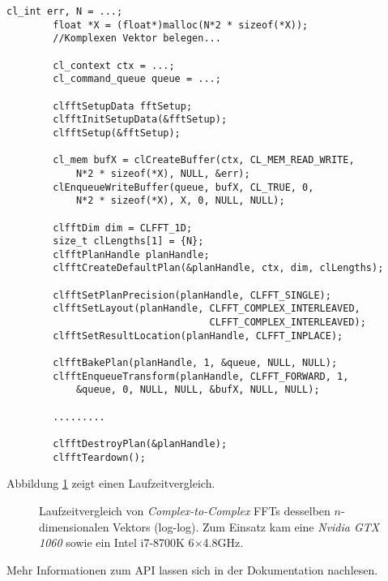 		\begin{lstlisting}[caption=clFFT Beispiel]
		cl_int err, N = ...;
		float *X = (float*)malloc(N*2 * sizeof(*X));
		//Komplexen Vektor belegen...
		
		cl_context ctx = ...;
		cl_command_queue queue = ...;
		
		clfftSetupData fftSetup;
		clfftInitSetupData(&fftSetup);
		clfftSetup(&fftSetup);

		cl_mem bufX = clCreateBuffer(ctx, CL_MEM_READ_WRITE, 
			N*2 * sizeof(*X), NULL, &err);
		clEnqueueWriteBuffer(queue, bufX, CL_TRUE, 0, 
			N*2 * sizeof(*X), X, 0, NULL, NULL);
		
		clfftDim dim = CLFFT_1D;
		size_t clLengths[1] = {N};
		clfftPlanHandle planHandle;
		clfftCreateDefaultPlan(&planHandle, ctx, dim, clLengths);

		clfftSetPlanPrecision(planHandle, CLFFT_SINGLE);
		clfftSetLayout(planHandle, CLFFT_COMPLEX_INTERLEAVED, 
			                       CLFFT_COMPLEX_INTERLEAVED);
		clfftSetResultLocation(planHandle, CLFFT_INPLACE);

		clfftBakePlan(planHandle, 1, &queue, NULL, NULL);
		clfftEnqueueTransform(planHandle, CLFFT_FORWARD, 1, 
			&queue, 0, NULL, NULL, &bufX, NULL, NULL);
		
		.........
		
		clfftDestroyPlan(&planHandle);
		clfftTeardown();
		\end{lstlisting}		
		
		\newpage
		
		Abbildung \ref{fig6:fft} zeigt einen Laufzeitvergleich.	
					
		\begin{figure}[h]
  			\centering
  			\caption[Vergleich von FFTs]{Laufzeitvergleich von \textit{Complex-to-Complex} FFTs desselben $n$-dimensionalen Vektors (log-log). Zum Einsatz kam eine \textit{Nvidia GTX 1060} sowie ein Intel i7-8700K 6$\times$4.8GHz.}
  			\label{fig6:fft}
		\end{figure}
		
		Mehr Informationen zum \Gls{API} lassen sich in der Dokumentation nachlesen. \autocite{clfftDoc}